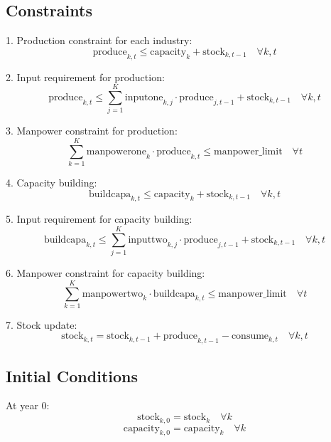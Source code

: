 \documentclass{article}
\begin{document}
\subsection*{Constraints}
1. Production constraint for each industry:
\[
\text{produce}_{k, t} \leq \text{capacity}_{k} + \text{stock}_{k, t-1} \quad \forall k, t
\]

2. Input requirement for production:
\[
\text{produce}_{k, t} \leq \sum_{j=1}^{K} \text{inputone}_{k, j} \cdot \text{produce}_{j, t-1} + \text{stock}_{k, t-1} \quad \forall k, t
\]

3. Manpower constraint for production:
\[
\sum_{k=1}^{K} \text{manpowerone}_{k} \cdot \text{produce}_{k, t} \leq \text{manpower\_limit} \quad \forall t
\]

4. Capacity building:
\[
\text{buildcapa}_{k, t} \leq \text{capacity}_{k} + \text{stock}_{k, t-1} \quad \forall k, t
\]

5. Input requirement for capacity building:
\[
\text{buildcapa}_{k, t} \leq \sum_{j=1}^{K} \text{inputtwo}_{k, j} \cdot \text{produce}_{j, t-1} + \text{stock}_{k, t-1} \quad \forall k, t
\]

6. Manpower constraint for capacity building:
\[
\sum_{k=1}^{K} \text{manpowertwo}_{k} \cdot \text{buildcapa}_{k, t} \leq \text{manpower\_limit} \quad \forall t
\]

7. Stock update:
\[
\text{stock}_{k, t} = \text{stock}_{k, t-1} + \text{produce}_{k, t-1} - \text{consume}_{k, t} \quad \forall k, t
\]

\subsection*{Initial Conditions}
At year 0:
\[
\text{stock}_{k, 0} = \text{stock}_{k} \quad \forall k
\]
\[
\text{capacity}_{k, 0} = \text{capacity}_{k} \quad \forall k
\]
\end{document}
